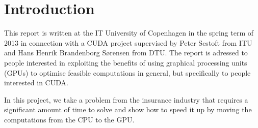 
\setcounter{page}{1}
\section{Introduction}
\label{introduction}

This report is written at the IT University of Copenhagen in the spring term of 2013 in connection with a CUDA project supervised by Peter Sestoft from ITU and Hans Henrik Brandenborg Sørensen from DTU. The report is adressed to people interested in exploiting the benefits of using graphical processing units (GPUs) to optimise feasible computations in general, but specifically to people interested in CUDA.

In this project, we take a problem from the insurance industry that requires a significant amount of time to solve and show how to speed it up by moving the computations from the CPU to the GPU.